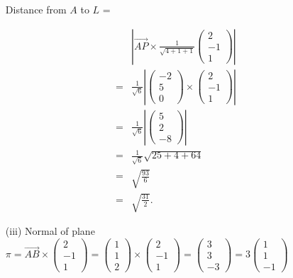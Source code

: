 \begin{enumerate}
Distance from $A$ to $L$ = 

\begin{align*}
 & \left|\overrightarrow{AP}\times\frac{1}{\sqrt{4+1+1}}\left(\begin{matrix}2\\
-1\\
1
\end{matrix}\right)\right|\\
= & \frac{1}{\sqrt{6}}\left|\left(\begin{matrix}-2\\
5\\
0
\end{matrix}\right)\times\left(\begin{matrix}2\\
-1\\
1
\end{matrix}\right)\right|\\
= & \frac{1}{\sqrt{6}}\left|\left(\begin{matrix}5\\
2\\
-8
\end{matrix}\right)\right|\\
= & \frac{1}{\sqrt{6}}\sqrt{25+4+64}\\
= & \sqrt{\frac{93}{6}}\\
= & \sqrt{\frac{31}{2}}.
\end{align*}

\item[(iii)]  Normal of plane $\pi=\overrightarrow{AB}\times\left(\begin{matrix}2\\
-1\\
1
\end{matrix}\right)=\left(\begin{matrix}1\\
1\\
2
\end{matrix}\right)\times\left(\begin{matrix}2\\
-1\\
1
\end{matrix}\right)=\left(\begin{matrix}3\\
3\\
-3
\end{matrix}\right)=3\left(\begin{matrix}1\\
1\\
-1
\end{matrix}\right)$


\end{enumerate}
